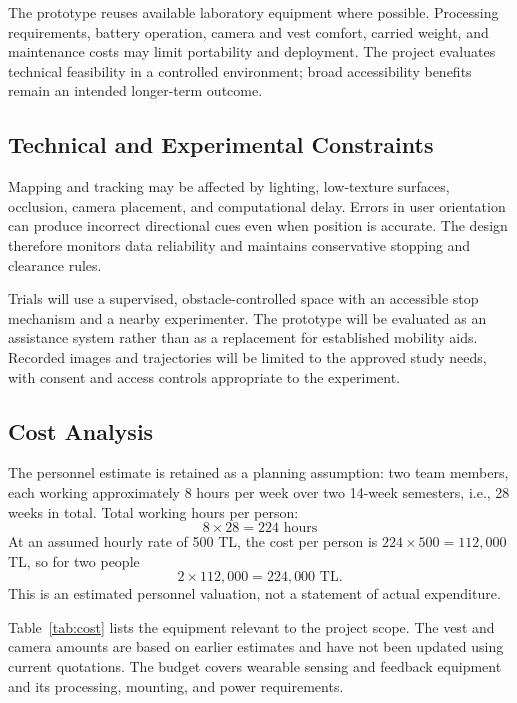 \documentclass[12pt]{report}
\begin{document}
The prototype reuses available laboratory equipment where possible. Processing requirements, battery operation, camera and vest comfort, carried weight, and maintenance costs may limit portability and deployment. The project evaluates technical feasibility in a controlled environment; broad accessibility benefits remain an intended longer-term outcome.

\subsection{Technical and Experimental Constraints}

Mapping and tracking may be affected by lighting, low-texture surfaces, occlusion, camera placement, and computational delay. Errors in user orientation can produce incorrect directional cues even when position is accurate. The design therefore monitors data reliability and maintains conservative stopping and clearance rules.

Trials will use a supervised, obstacle-controlled space with an accessible stop mechanism and a nearby experimenter. The prototype will be evaluated as an assistance system rather than as a replacement for established mobility aids. Recorded images and trajectories will be limited to the approved study needs, with consent and access controls appropriate to the experiment.

\subsection{Cost Analysis}

The personnel estimate is retained as a planning assumption: two team members, each working approximately 8 hours per week over two 14-week semesters, i.e., 28 weeks in total. Total working hours per person:
\[
8 \times 28 = 224 \text{ hours}
\]
At an assumed hourly rate of 500 TL, the cost per person is $224 \times 500 = 112{,}000$ TL, so for two people
\[
2 \times 112{,}000 = \boxed{224{,}000 \text{ TL}}.
\]
This is an estimated personnel valuation, not a statement of actual expenditure.

Table~\ref{tab:cost} lists the equipment relevant to the project scope. The vest and camera amounts are based on earlier estimates and have not been updated using current quotations. The budget covers wearable sensing and feedback equipment and its processing, mounting, and power requirements.
\end{document}
